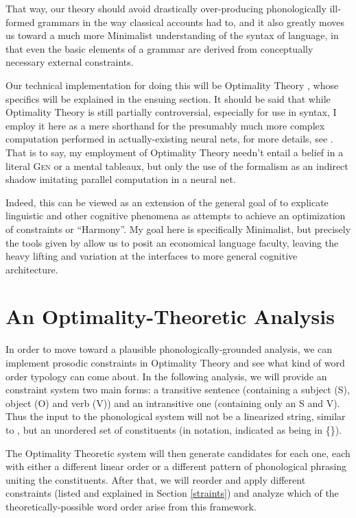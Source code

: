 \documentclass{article}
\begin{document}
That way, our theory should avoid drastically over-producing phonologically ill-formed grammars in the way classical accounts had to, and it also greatly moves us toward a much more Minimalist understanding of the syntax of language, in that even the basic elements of a grammar are derived from conceptually necessary external constraints.

Our technical implementation for doing this will be Optimality Theory \parencite{prince93}, whose specifics will be explained in the ensuing section.
It should be said that while Optimality Theory is still partially controversial, especially for use in syntax, I employ it here as a mere shorthand for the presumably much more complex computation performed in actually-existing neural nets, for more details, see \textcite{prince97}.
That is to say, my employment of Optimality Theory needn't entail a belief in a literal {\textsc{Gen}} or a mental tableaux, but only the use of the formalism as an indirect shadow imitating parallel computation in a neural net.

Indeed, this can be viewed as an extension of the general goal of \textcite{smolensky06} to explicate linguistic and other cognitive phenomena as attempts to achieve an optimization of constraints or ``Harmony''.
My goal here is specifically Minimalist, but precisely the tools given by \textcite{smolensky06} allow us to posit an economical language faculty, leaving the heavy lifting and variation at the interfaces to more general cognitive architecture.

\section{An Optimality-Theoretic Analysis\label{otanal}}

In order to move toward a plausible phonologically-grounded analysis, we can implement prosodic constraints in Optimality Theory \parencite{prince93} and see what kind of word order typology can come about.
In the following analysis, we will provide an constraint system two main forms: a transitive sentence (containing a subject (S), object (O) and verb (V)) and an intransitive one (containing only an S and V).
Thus the input to the phonological system will not be a linearized string, similar to \textcite{halle87}, but an unordered set of constituents (in notation, indicated as being in \{\}).

The Optimality Theoretic system will then generate candidates for each one, each with either a different linear order or a different pattern of phonological phrasing uniting the constituents.
After that, we will reorder and apply different constraints (listed and explained in Section \ref{straints}) and analyze which of the theoretically-possible word order arise from this framework.
\end{document}
